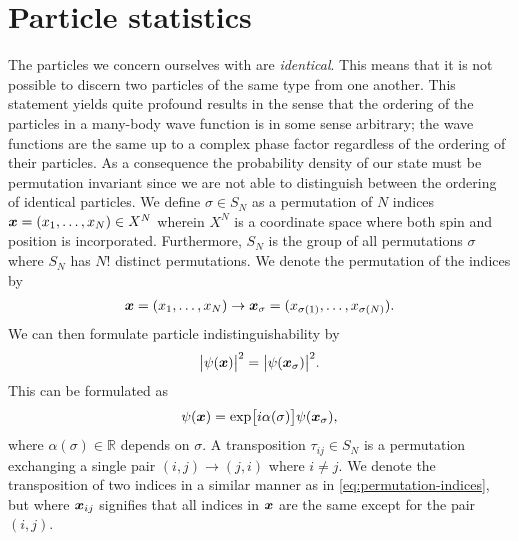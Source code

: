     \section{Particle statistics}
        \label{sec:particle-statistics}
        The particles we concern ourselves with are \emph{identical}.
        This means that it is not possible to discern two particles of the
        same type from one another.
        This statement yields quite profound results in the sense that the
        ordering of the particles in a many-body wave function is in some sense
        arbitrary; the wave functions are the same up to a complex phase factor
        regardless of the ordering of their particles.
        As a consequence the probability density of our state must be
        permutation invariant since we are not able to distinguish between the
        ordering of identical particles.
        We define $\sigma \in S_{N}$ as a permutation of $N$ indices $\boldsymbol{x}
        = (x_1, \dots, x_N) \in X^{N}$ wherein $X^N$ is a coordinate space where
        both spin and position is incorporated.
        Furthermore, $S_{N}$ is the group of all permutations $\sigma$ where
        $S_{N}$ has $N!$ distinct permutations.
        We denote the permutation of the indices by
        \begin{align}
            \boldsymbol{x} = (x_1, \dots, x_N)
            \to \boldsymbol{x}_{\sigma} = (x_{\sigma(1)}, \dots, x_{\sigma(N)}).
            \label{eq:permutation-indices}
        \end{align}
        We can then formulate particle indistinguishability by
        \cite{leinaas1977, kvaal2017notes}
        \begin{align}
            \abs{
                \psi(\boldsymbol{x})
            }^2
            = \abs{
                \psi(\boldsymbol{x}_{\sigma})
            }^2.
            \label{eq:particle-indistinguishability}
        \end{align}
        This can be formulated as \cite{kvaal2017notes}
        \begin{align}
            \psi(\boldsymbol{x}) = \exp[i\alpha(\sigma)] \psi(\boldsymbol{x}_{\sigma}),
        \end{align}
        where $\alpha(\sigma) \in \mathbb{R}$ depends on $\sigma$.
        A transposition $\tau_{ij} \in S_{N}$ is a permutation exchanging a
        single pair $(i, j) \to (j, i)$ where $i \neq j$.
        We denote the transposition of two indices in a similar manner as in
        \autoref{eq:permutation-indices}, but where $\boldsymbol{x}_{ij}$ signifies that
        all indices in $\boldsymbol{x}$ are the same except for the pair $(i, j)$.
